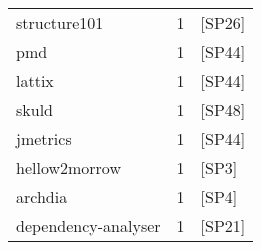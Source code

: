 \begin{tabular}{lrl}
        structure101 &      1 &                                           [SP26] \\
                 pmd &      1 &                                           [SP44] \\
              lattix &      1 &                                           [SP44] \\
               skuld &      1 &                                           [SP48] \\
            jmetrics &      1 &                                           [SP44] \\
       hellow2morrow &      1 &                                            [SP3] \\
             archdia &      1 &                                            [SP4] \\
 dependency-analyser &      1 &                                           [SP21] \\
\bottomrule
\end{tabular}
